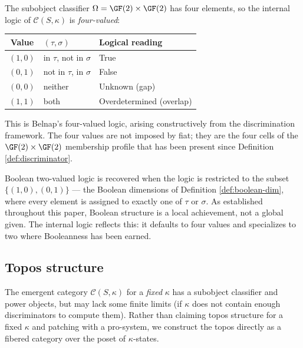 \begin{remark}
The subobject classifier $\Omega = \GF(2) \times \GF(2)$
has four elements, so the internal logic of
$\mathcal{C}(S,\kappa)$ is \emph{four-valued}:
\begin{center}
\begin{tabular}{c|l|l}
Value & $(\tau, \sigma)$ & Logical reading \\
\hline
$(1,0)$ & in $\tau$, not in $\sigma$ & True \\
$(0,1)$ & not in $\tau$, in $\sigma$ & False \\
$(0,0)$ & neither & Unknown (gap) \\
$(1,1)$ & both & Overdetermined (overlap)
\end{tabular}
\end{center}
This is Belnap's four-valued logic, arising constructively
from the discrimination framework. The four values are not
imposed by fiat; they are the four cells of the
$\GF(2) \times \GF(2)$ membership profile that has been
present since Definition \ref{def:discriminator}.

Boolean two-valued logic is recovered when the logic
is restricted to the subset $\{(1,0), (0,1)\}$ --- the
Boolean dimensions of Definition \ref{def:boolean-dim},
where every element is assigned to exactly one of $\tau$
or $\sigma$. As established throughout this paper,
Boolean structure is a local achievement, not a global
given. The internal logic reflects this: it defaults to
four values and specializes to two where Booleanness has
been earned.
\end{remark}

\subsection{Topos structure}

The emergent category $\mathcal{C}(S,\kappa)$ for a
\emph{fixed} $\kappa$ has a subobject classifier and power
objects, but may lack some finite limits (if $\kappa$ does
not contain enough discriminators to compute them). Rather
than claiming topos structure for a fixed $\kappa$ and
patching with a pro-system, we construct the topos
directly as a fibered category over the poset of
$\kappa$-states.

